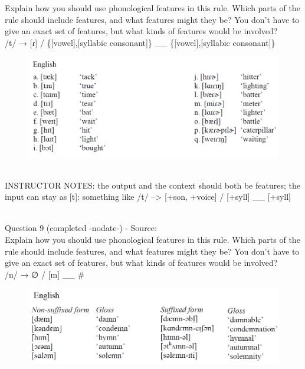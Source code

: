 \documentclass[12pt]{article}
\begin{document}
Explain how you should use phonological features in this rule. Which parts of the rule should include features, and what features might they be? You don't have to give an exact set of features, but what kinds of features would be involved?\\

/t/ → {[ɾ]} / \{{[vowel]},{[syllabic consonant]}\} \_\_ \{{[vowel]},{[syllabic consonant]}\}

\begin{figure}[H]
\includegraphics{../images/english_t_flap.png}
\end{figure}

~\\
INSTRUCTOR NOTES: the output and the context should both be features; the input can stay as [t]: something like /t/ --> [+son, +voice] / [+syll] \_\_ [+syll]


~\\

{\large Question 9} (completed -nodate-) - Source: \\

Explain how you should use phonological features in this rule. Which parts of the rule should include features, and what features might they be? You don't have to give an exact set of features, but what kinds of features would be involved?\\

/n/ → ∅ / {[m]} \_\_ \#

\begin{figure}[H]
\includegraphics{../images/english_stemalternations.png}
\end{figure}
\end{document}
